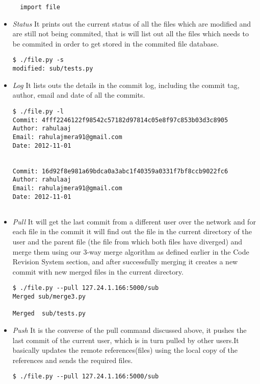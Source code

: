 \documentclass[12pt]{article}
\begin{document}
\begin{itemize}
\begin{lstlisting}
  import file 
\end{lstlisting}
\item \emph{Status} It prints out the current status of all the files which are modified and are still not being commited, that is will list out all the files which needs to be commited in order to get stored in the commited file database.
\begin{lstlisting}
$ ./file.py -s
modified: sub/tests.py
\end{lstlisting}
\item \emph{Log} It lists outs the details in the commit log, including the commit tag, author, email and date of all the commits.
\begin{lstlisting}
$ ./file.py -l
Commit: 4fff2246122f98542c57182d97814c05e8f97c853b03d3c8905
Author: rahulaaj
Email: rahulajmera91@gmail.com
Date: 2012-11-01


Commit: 16d92f8e981a69bdca0a3abc1f40359a0331f7bf8ccb9022fc6
Author: rahulaaj
Email: rahulajmera91@gmail.com
Date: 2012-11-01


\end{lstlisting}
\item \emph{Pull} It will get the last commit from a different user over the network and for each file in the commit it will find out the file in the current directory of the user and the parent file (the file from which both files have diverged) and merge them using our 3-way merge algorithm as defined earlier in the Code Revision System section, and after successfully merging it creates a new commit with new merged files in the current directory.
\begin{lstlisting}
$ ./file.py --pull 127.24.1.166:5000/sub
Merged sub/merge3.py

Merged  sub/tests.py
\end{lstlisting}
\item \emph{Push} It is the converse of the pull command discussed above, it pushes the last commit of the current user, which is in turn pulled by other users.It basically updates the remote references(files) using the local copy of the references and sends the required files. 
\begin{lstlisting}
$ ./file.py --pull 127.24.1.166:5000/sub

\end{lstlisting}
\end{itemize}
\end{document}
